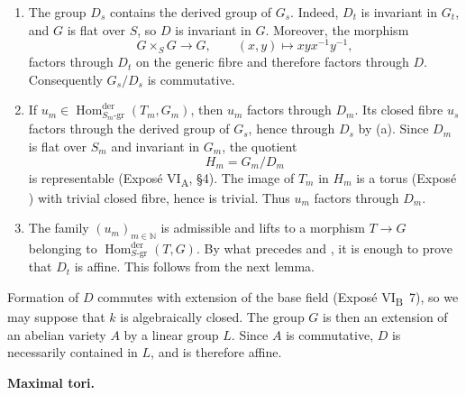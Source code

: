 \begin{enumerate}
\renewcommand{\labelenumi}{\textup{\alph{enumi})}}
\item The group \(D_s\) contains the derived group of \(G_s\).
Indeed, \(D_t\) is invariant in \(G_t\), and \(G\) is flat over
\(S\), so \(D\) is invariant in \(G\). Moreover, the morphism
\[
  G\times_S G\longrightarrow G,
  \qquad (x,y)\longmapsto xyx^{-1}y^{-1},
\]
factors through \(D_t\) on the generic fibre and therefore factors
through \(D\). Consequently \(G_s/D_s\) is commutative.

\item If
\(u_m\in
\operatorname{Hom}^{\mathrm{der}}_{S_m\text{-gr}}(T_m,G_m)\),
then \(u_m\) factors through \(D_m\). Its closed fibre \(u_s\)
factors through the derived group of \(G_s\), hence through \(D_s\)
by \textup{(a)}. Since \(D_m\) is flat over \(S_m\) and invariant
in \(G_m\), the quotient
\[
  H_m=G_m/D_m
\]
is representable (Exposé VI\textsubscript{A}, \S4). The image of
\(T_m\) in \(H_m\) is a torus (Exposé ) with trivial closed
fibre, hence is trivial. Thus \(u_m\) factors through \(D_m\).

\item The family \((u_m)_{m\in\mathbb N}\) is admissible and lifts
to a morphism \(T\to G\) belonging to
\(\operatorname{Hom}^{\mathrm{der}}_{S\text{-gr}}(T,G)\).
By what precedes and , it is enough to prove that
\(D_t\) is affine. This follows from the next lemma.
\end{enumerate}


Formation of \(D\) commutes with extension of the base field
(Exposé VI\textsubscript{B}~7), so we may suppose that \(k\) is
algebraically closed. The group \(G\) is then an extension of an
abelian variety \(A\) by a linear group \(L\). Since \(A\) is
commutative, \(D\) is necessarily contained in \(L\), and is
therefore affine.

\medskip\noindent\textbf{Maximal tori.}

